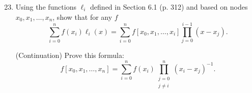 \begin{frame}
	\begin{enumerate}\setcounter{enumi}{22}
		\item

		      Using the functions $\ell_{i}$ defined in Section 6.1
		      (p. 312) and based on nodes $x_{0}, x_{1}, \ldots, x_{n}$,
		      show that for any $f$
		      \begin{equation*}
			      \sum_{i=0}^{n}f\left(x_{i}\right)\ell_{i}\left(x\right)=
			      \sum_{i=0}^{n}f\left[x_{0},x_{1},\ldots,x_{i}\right]
			      \prod_{j=0}^{i-1}\left(x-x_{j}\right).
		      \end{equation*}

		      (Continuation) Prove this formula:
		      \begin{equation*}
			      f\left[x_{0},x_{1},\ldots,x_{n}\right]=
			      \sum_{i=0}^{n}f\left(x_{i}\right)
			      \prod_{\substack{j=0\\j\neq i}}^{n}
			      {\left(x_{i}-x_{j}\right)}^{-1}.
		      \end{equation*}
	\end{enumerate}
\end{frame}
